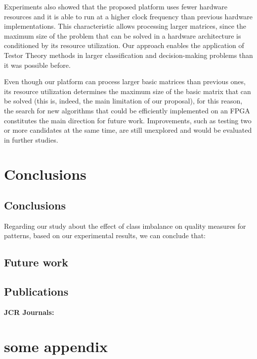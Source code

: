 \documentclass[letterpaper, twoside, openright, 12pt]{book}%
\begin{document}
	Experiments also showed that the proposed platform uses fewer hardware resources and it is able to run at a higher clock frequency than previous hardware implementations. This characteristic allows processing larger matrices, since the maximum size of the problem that can be solved in a hardware architecture is conditioned by its resource utilization. Our approach enables the application of Testor Theory methods in larger classification and decision-making problems than it was possible before. 
	
	Even though our platform can process larger basic matrices than previous ones, its resource utilization determines the maximum size of the basic matrix that can be solved (this is, indeed, the main limitation of our proposal), for this reason, the search for new algorithms that could be efficiently implemented on an FPGA constitutes the main direction for future work. Improvements, such as testing two or more candidates at the same time, are still unexplored and would be evaluated in further studies.

%	
\chapter{Conclusions} \label{chap:Conclusions}
%

\section{Conclusions} \label{sec:Conclusions}

Regarding our study about the effect of class imbalance on quality measures for patterns, based on our experimental results, we can conclude that:


\section{Future work} \label{sec:Futurework}

\section{Publications} \label{sec:Publications}


\singlespace 

\textbf{JCR Journals:}


\singlespace
\small
{}



\pagestyle{fancy}
\normalsize
\appendix
{}

\chapter{some appendix} \label{app:StatisticalTests}



\end{document}
